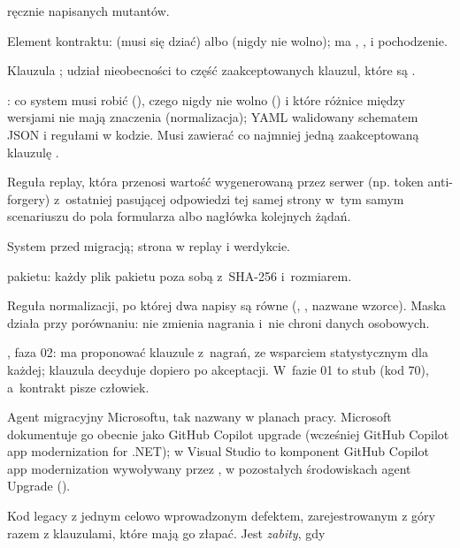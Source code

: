 \begin{description}[style=nextline, leftmargin=1.2em, font=\normalfont\bfseries]
        ręcznie napisanych mutantów.
  \item[klauzula] Element kontraktu:  (musi się dziać) albo
         (nigdy nie wolno); ma , ,
         i pochodzenie.
  \item[klauzula nieobecności] Klauzula ; udział nieobecności to część
        zaakceptowanych klauzul, które są .
  \item[kontrakt] : co system musi robić (), czego
        nigdy nie wolno () i które różnice między wersjami nie mają znaczenia
        (normalizacja); YAML walidowany schematem JSON i regułami w kodzie. Musi zawierać co
        najmniej jedną zaakceptowaną klauzulę .
  \item[korelacja] Reguła replay, która przenosi wartość wygenerowaną przez serwer (np.
        token anti-forgery) z~ostatniej pasującej odpowiedzi tej samej strony w~tym samym
        scenariuszu do pola formularza albo nagłówka kolejnych żądań.
  \item[legacy] System przed migracją; strona  w replay i werdykcie.
  \item[manifest]  pakietu: każdy plik pakietu poza sobą
        z~SHA-256 i~rozmiarem.
  \item[maska] Reguła normalizacji, po której dwa napisy są równe (,
        , nazwane wzorce). Maska działa przy porównaniu: nie zmienia
        nagrania i~nie chroni danych osobowych.
  \item[miner kontraktu (C2)] , faza 02: ma proponować klauzule z~nagrań,
        ze wsparciem statystycznym dla każdej; klauzula decyduje dopiero po akceptacji.
        W~fazie 01 to stub (kod 70), a~kontrakt pisze człowiek.
  \item[modernize-dotnet] Agent migracyjny Microsoftu, tak nazwany w planach pracy. Microsoft
        dokumentuje go obecnie jako GitHub Copilot upgrade (wcześniej GitHub Copilot app
        modernization for .NET); w Visual Studio to komponent GitHub Copilot app modernization
        wywoływany przez , w pozostałych środowiskach agent Upgrade
        ().
  \item[mutant (P9)] Kod legacy z jednym celowo wprowadzonym defektem, zarejestrowanym
        z góry razem z klauzulami, które mają go złapać. Jest \emph{zabity}, gdy

\end{description}
